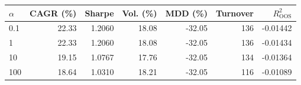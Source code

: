 \begin{tabular}{lrrrrrr}
\toprule
$\alpha$ & CAGR (\%) & Sharpe & Vol. (\%) & MDD (\%) & Turnover & $R^2_{\mathrm{OOS}}$ \\
\midrule
0.1 & 22.33 & 1.2060 & 18.08 & -32.05 & 136 & -0.01442 \\
1 & 22.33 & 1.2060 & 18.08 & -32.05 & 136 & -0.01434 \\
10 & 19.15 & 1.0767 & 17.76 & -32.05 & 134 & -0.01364 \\
100 & 18.64 & 1.0310 & 18.21 & -32.05 & 116 & -0.01089 \\
\bottomrule
\end{tabular}
